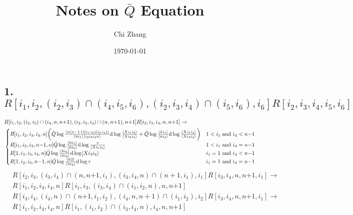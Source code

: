 \documentclass{article}
\title{Notes on $\bar{Q}$ Equation}
\author{Chi Zhang}
\date{\today}
\begin{document}
\maketitle
\subsection*{1. $R[i_{1},i_{2},(i_{2},i_{3})\cap(i_{4},i_{5},i_{6}),(i_{2},i_{3},i_{4})\cap(i_{5},i_{6}),i_{6}]R[i_{2},i_{3},i_{4},i_{5},i_{6}]$}
\begin{align*}
    &R[i_{1},i_{2},(i_{2},i_{3})\cap(i_{4},n,n{+1}),(i_{2},i_{3},i_{4})\cap(n,n{+}1),n{+1}] R[i_{2},i_{3},i_{4},n,n{+}1] \to  \\
    &\begin{cases}
        R[i_{1},i_{2},i_{3},i_{4},n]\biggl(\bar{Q}\log\frac{\langle n(n{-}1\,1)(i_{1}\,i_{2})(i_{3}\,i_{4})\rangle}{\langle \bar{n} i_{1}\rangle\langle i_{2}i_{3}i_{4}n\rangle}\mathrm{d} \log\frac{\langle Xi_{1}i_{2}\rangle}{\langle Xi_{3}i_{4}\rangle}+\bar{Q}\log\frac{\langle \bar{n}i_{1}\rangle}{\langle\bar{n}i_{4}\rangle}\mathrm{d}\log\frac{\langle Xi_{1}i_{4}\rangle}{\langle Xi_{3}i_{4}\rangle}\biggr) & 1<i_{1} \text{ and  }i_{4}<n{-}1 \\
        R[i_{1},i_{2},i_{3},n{-}1,n]\bar{Q}\log\frac{\langle\bar{n}i_{1}\rangle}{\langle\bar{n}i_{3}\rangle}\mathrm{d}\log\frac{\tau}{\langle Xi_{1}i_{2}\rangle} & 1<i_{1} \text{ and }i_{4}=n{-1} \\
        R[1,i_{2},i_{3},i_{4},n]\bar{Q}\log\frac{\langle\bar{n}i_{4}\rangle}{\langle\bar{n}i_{2}\rangle}\mathrm{d}\log\langle Xi_{3}i_{4}\rangle  & i_{1}=1 \text{ and }i_{4}<n{-1} \\
        R[1,i_{2},i_{3},n{-1},n] \bar{Q}\log\frac{\langle\bar{n}2\rangle}{\langle\bar{n}i_{2}\rangle}\mathrm{d}\log\tau &i_{1}=1 \text{ and }i_{4}=n{-1}
    \end{cases}
\end{align*}
\begin{align*}
    &R[i_{2},i_{3},(i_{3},i_{4})\cap(n,n{+1},i_{1}),(i_{3},i_{4},n)\cap(n{+}1,i_{1}),i_{1}]R[i_{3},i_{4},n,n{+1},i_{1}] \to \\
    &R[i_{1},i_{2},i_{3},i_{4},n]R[i_{1},i_{3},(i_{3},i_{4})\cap(i_{1},i_{2},n),n,n{+1}]
\end{align*}
\begin{align*}
    &R[i_{3},i_{4},(i_{4},n)\cap(n{+1},i_{1},i_{2}),(i_{4},n,n{+}1)\cap(i_{1},i_{2}),i_{2}]R[i_{3},i_{4},n,n{+1},i_{1}] \to \\
    &R[i_{1},i_{2},i_{3},i_{4},n]R[i_{1},(i_{1},i_{2})\cap(i_{3},i_{4},n),i_{4},n,n{+1}]
\end{align*}
\end{document}
